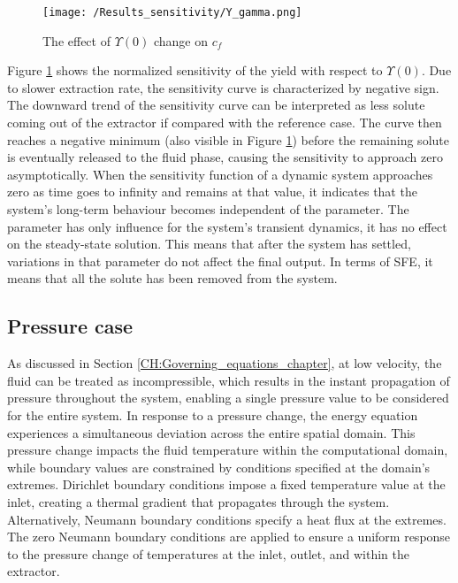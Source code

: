 \documentclass[a4paper,fleqn]{cas-dc}
\begin{document}
{	\begin{figure}[!ht]
		\centering
		\texttt{[image: /Results\_sensitivity/Y\_gamma.png]}
		\caption{The effect of $\Upsilon(0)$ change on $c_f$}
		\label{fig:Sensitivty_Gamma_Y}
	\end{figure}
	
	Figure \ref{fig:Sensitivty_Gamma_Y}  shows the normalized sensitivity of the yield with respect to $\Upsilon(0)$. Due to slower extraction rate, the sensitivity curve is characterized by negative sign. The  downward trend of the sensitivity curve can be interpreted as less solute coming out of the extractor if compared with the reference case. The curve then reaches a negative minimum (also visible in Figure \ref{fig:Sensitivty_Gamma_Y}) before the remaining solute is eventually released to the fluid phase, causing the sensitivity to approach zero asymptotically. When the sensitivity function of a dynamic system approaches zero as time goes to infinity and remains at that value, it indicates that the system's long-term behaviour becomes independent of the parameter. The parameter has only influence for the system's transient dynamics, it has no effect on the steady-state solution. This means that after the system has settled, variations in that parameter do not affect the final output. In terms of SFE, it means that all the solute has been removed from the system.}
		
	\subsection{Pressure case}
	As discussed in Section \ref{CH:Governing_equations_chapter}, at low velocity, the fluid can be treated as incompressible, which results in the instant propagation of pressure throughout the system, enabling a single pressure value to be considered for the entire system. In response to a pressure change, the energy equation experiences a simultaneous deviation across the entire spatial domain. This pressure change impacts the fluid temperature within the computational domain, while boundary values are constrained by conditions specified at the domain's extremes. Dirichlet boundary conditions impose a fixed temperature value at the inlet, creating a thermal gradient that propagates through the system. Alternatively,  Neumann boundary conditions specify a heat flux at the extremes. The zero Neumann boundary conditions are applied to ensure a uniform response to the pressure change of temperatures at the inlet, outlet, and within the extractor.
		
\end{document}
